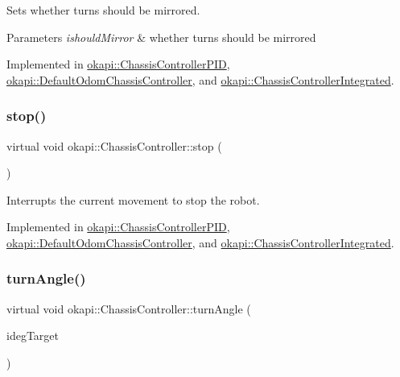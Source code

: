 Sets whether turns should be mirrored.


\begin{DoxyParams}{Parameters}
{\em ishould\+Mirror} & whether turns should be mirrored \\
\hline
\end{DoxyParams}


Implemented in \mbox{\hyperlink{classokapi_1_1ChassisControllerPID_a1e68419f6e695fd35576a6d886618741}{okapi\+::\+Chassis\+Controller\+P\+ID}}, \mbox{\hyperlink{classokapi_1_1DefaultOdomChassisController_aed92ba0b7a9fc15bf645f3789e8598ae}{okapi\+::\+Default\+Odom\+Chassis\+Controller}}, and \mbox{\hyperlink{classokapi_1_1ChassisControllerIntegrated_a37d538f92439644efa50a226c3cefd6d}{okapi\+::\+Chassis\+Controller\+Integrated}}.

\mbox{\label{classokapi_1_1ChassisController_ac67edbbbe1c8480c4503b9875a3719cd}} 
\subsubsection{\texorpdfstring{stop()}{stop()}}
{\footnotesize\ttfamily virtual void okapi\+::\+Chassis\+Controller\+::stop (\begin{DoxyParamCaption}{ }\end{DoxyParamCaption})\hspace{0.3cm}{\ttfamily [pure virtual]}}

Interrupts the current movement to stop the robot. 

Implemented in \mbox{\hyperlink{classokapi_1_1ChassisControllerPID_a852462fc20fb2322bbb3fd984b01a121}{okapi\+::\+Chassis\+Controller\+P\+ID}}, \mbox{\hyperlink{classokapi_1_1DefaultOdomChassisController_af6a98415e2c4e17dfec77e215efb1a41}{okapi\+::\+Default\+Odom\+Chassis\+Controller}}, and \mbox{\hyperlink{classokapi_1_1ChassisControllerIntegrated_aab2f5d5cfb8ad96bd32be26a5a4e7113}{okapi\+::\+Chassis\+Controller\+Integrated}}.

\mbox{\label{classokapi_1_1ChassisController_aab12308b3fad6793c007d7a33730a3f7}} 
\subsubsection{\texorpdfstring{turnAngle()}{turnAngle()}\hspace{0.1cm}{\footnotesize\ttfamily [1/2]}}
{\footnotesize\ttfamily virtual void okapi\+::\+Chassis\+Controller\+::turn\+Angle (\begin{DoxyParamCaption}\item[{Q\+Angle}]{ideg\+Target }\end{DoxyParamCaption})\hspace{0.3cm}{\ttfamily [pure virtual]}}

